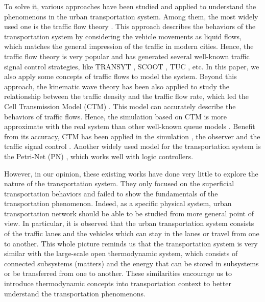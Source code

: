 \documentclass[preprint,authoryear,12pt]{elsarticle}
\begin{document}
To solve it, various approaches have been studied and applied to
understand the phenomenons in the urban transportation system. Among
them, the most widely used one is the traffic flow theory
\citep{nathan_h_gartner_revised_2005}. This approach describes the
behaviors of the transportation system by considering the vehicle
movements as liquid flows, which matches the general impression of
the traffic in modern cities. Hence, the traffic flow theory is very
popular and has generated several well-known traffic signal control
strategies, like TRANSYT
\citep{robertson_tansyt_1969,hale_traffic_2005}, SCOOT
\citep{bretherton_r_d_scoot_1982}, TUC
\citep{diakaki_multivariable_2002}, etc. In this paper, we also
apply some concepts of traffic flows to model the system. Beyond this
approach, the kinematic wave theory has been also applied to study the
relationship between the traffic density and the traffic flow rate,
which led the Cell Transmission Model (CTM)
\citep{daganzo_cell_1995,flotterod_operational_2011}. This model can
accurately describe the behaviors of traffic flows. Hence, the
simulation based on CTM is more approximate with the real system than
other well-known queue models \citep{almasri_online_2005}. Benefit
from its accuracy, CTM has been applied in the simulation
\citep{Su2013}, the observer \citep{CanudasdeWit2012} and the traffic
signal control \citep{Pohlmann2010}. Another widely used model for the
transportation system is the Petri-Net (PN)
\citep{dotoli_urban_2006,ng_review_2013}, which works well with logic
controllers.

However, in our opinion, these existing works have done very little
to explore the nature of the transportation system. They only focused
on the superficial transportation behaviors and failed to show the
fundamentals of the transportation phenomenon. Indeed, as a specific
physical system, urban transportation network should be able to be
studied from more general point of view. In particular, it is
observed that the urban transportation system consists of the traffic
lanes and the vehicles which can stay in the lanes or travel from one
to another. This whole picture reminds us that the transportation
system is very similar with the large-scale open thermodynamic system,
which consists of connected subsystems (matters) and the energy that
can be stored in subsystems or be transferred from one to another.
These similarities encourage us to introduce thermodynamic concepts
into transportation context to better understand the transportation
phenomenons.
\end{document}
